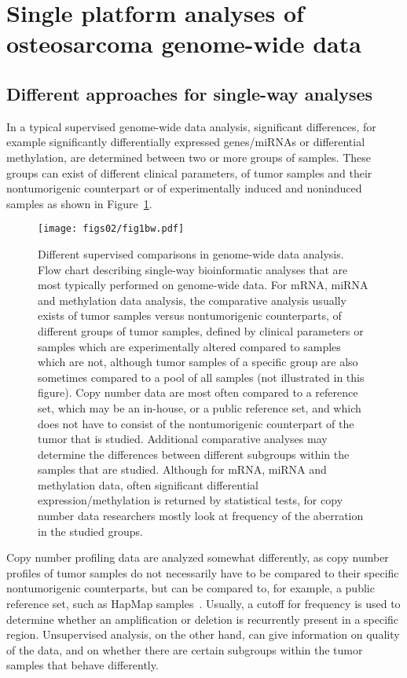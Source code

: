 %
\section{Single platform analyses of osteosarcoma genome\hyp{}wide data}\label{single2}
\subsection{Different approaches for single\hyp{}way analyses}
In a typical supervised genome\hyp{}wide data analysis, significant
differences, for example significantly differentially expressed
genes/miRNAs or differential methylation, are determined
between two or more groups of samples. These groups can
exist of different clinical parameters, of tumor samples and
their nontumorigenic counterpart or of experimentally
induced and noninduced samples as shown in Figure~\ref{fig2.1}.
%
\begin{figure}[htbp]
  \centering
    \texttt{[image: figs02/fig1bw.pdf]}	%
    \caption{Different supervised comparisons in genome\hyp{}wide data
analysis. Flow chart describing single\hyp{}way bioinformatic analyses
that are most typically performed on genome\hyp{}wide data. For mRNA,
miRNA and methylation data analysis, the comparative analysis
usually exists of tumor samples versus nontumorigenic counterparts,
of different groups of tumor samples, defined by clinical parameters
or samples which are experimentally altered compared to
samples which are not, although tumor samples of a specific
group are also sometimes compared to a pool of all samples (not
illustrated in this figure). Copy number data are most often compared
to a reference set, which may be an in-house, or a public
reference set, and which does not have to consist of the nontumorigenic
counterpart of the tumor that is studied. Additional comparative
analyses may determine the differences between different
subgroups within the samples that are studied. Although for
mRNA, miRNA and methylation data, often significant differential
expression/methylation is returned by statistical tests, for copy
number data researchers mostly look at frequency of the aberration
in the studied groups.}
     \label{fig2.1}
\end{figure}
%
Copy
number profiling data are analyzed somewhat differently, as
copy number profiles of tumor samples do not necessarily
have to be compared to their specific nontumorigenic counterparts,
but can be compared to, for example, a public reference
set, such as HapMap samples~\cite{gibbs2003international}. Usually, a cutoff for
frequency is used to determine whether an amplification or
deletion is recurrently present in a specific region. Unsupervised
analysis, on the other hand, can give information on
quality of the data, and on whether there are certain subgroups
within the tumor samples that behave differently.

